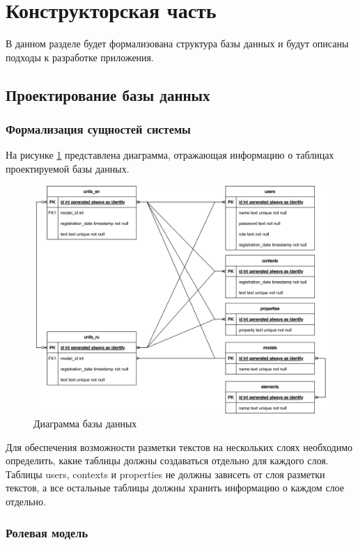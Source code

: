 \section{Конструкторская часть}

В данном разделе будет формализована структура базы данных и будут описаны подходы к разработке приложения.

\subsection{Проектирование базы данных}

\subsubsection{Формализация сущностей системы}

На рисунке \ref{fig:db} представлена диаграмма, отражающая информацию о таблицах проектируемой базы данных.

\begin{figure}[h]
	\centering
	\includegraphics[width=\textwidth ]{img/db/db.drawio.png}
	\caption{Диаграмма базы данных}
	\label{fig:db}
\end{figure} 

Для обеспечения возможности разметки текстов на нескольких слоях необходимо определить, какие таблицы должны создаваться отдельно для каждого слоя. Таблицы users, contexts и properties не должны зависеть от слоя разметки текстов, а все остальные таблицы должны хранить информацию о каждом слое отдельно.

\subsubsection{Ролевая модель}

